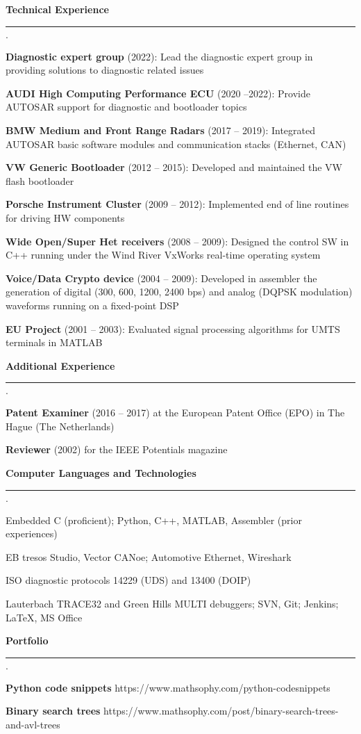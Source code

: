 \documentclass[11pt]{article}
\newcommand{\cvsection}[1]{%
\textbf{#1}\smallskip\hrule\smallskip}
\newenvironment{cvlist}[1][$\cdot$]%
{\begin{list}{#1}{\setlength{\labelwidth}{2cm}%
\setlength{\leftmargin}{0.5cm}\setlength{\labelsep}{0.2cm}\setlength{\partopsep}{0cm}%
\setlength{\rightmargin}{0.5cm}\setlength{\parsep}{0cm}\setlength{\topsep}{0cm}%
\setlength{\itemsep}{0cm}}}%
{\end{list}}
\begin{document}
\bigskip

\cvsection{Technical Experience}
\begin{cvlist}
\item \textbf{Diagnostic expert group} (2022): Lead the diagnostic expert group in providing solutions to diagnostic related issues
\item \textbf{AUDI High Computing Performance ECU} (2020 --2022): Provide AUTOSAR support for diagnostic and bootloader topics
\item \textbf{BMW Medium and Front Range Radars} (2017 -- 2019): Integrated AUTOSAR basic software modules and communication stacks (Ethernet, CAN)
\item \textbf{VW Generic Bootloader} (2012 -- 2015): Developed and maintained the VW flash bootloader
\item \textbf{Porsche Instrument Cluster} (2009 -- 2012): Implemented end of line routines for driving HW components
\item \textbf{Wide Open/Super Het receivers} (2008 -- 2009): Designed the control SW in C++ running under the Wind River VxWorks real-time operating system
\item \textbf{Voice/Data Crypto device} (2004 -- 2009): Developed in assembler the generation of digital (300, 600, 1200, 2400 bps) and analog (DQPSK modulation) waveforms running on a fixed-point DSP
\item \textbf{EU Project} (2001 -- 2003): Evaluated signal processing algorithms for UMTS terminals in MATLAB
\end{cvlist}

\bigskip

\cvsection{Additional Experience}
\begin{cvlist}
\item \textbf{Patent Examiner} (2016 -- 2017) at the European Patent Office (EPO) in The Hague (The Netherlands)
\item \textbf{Reviewer} (2002) for the IEEE Potentials magazine
\end{cvlist}

\bigskip

\cvsection{Computer Languages and Technologies}
\begin{cvlist}
\item Embedded C (proficient); Python, C++, MATLAB, Assembler (prior experiences)
\item EB tresos Studio, Vector CANoe; Automotive Ethernet, Wireshark
\item ISO diagnostic protocols 14229 (UDS) and 13400 (DOIP)
\item Lauterbach TRACE32 and Green Hills MULTI debuggers; SVN, Git; Jenkins; \LaTeX, MS Office
\end{cvlist}

\bigskip

\cvsection{Portfolio}
\begin{cvlist}
\item \textbf{Python code snippets} https://www.mathsophy.com/python-codesnippets
\item \textbf{Binary search trees} https://www.mathsophy.com/post/binary-search-trees-and-avl-trees
\end{cvlist}
\end{document}
